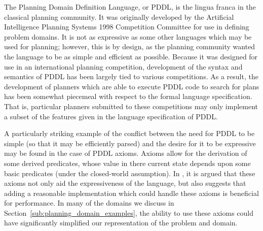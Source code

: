The Planning Domain Definition Language, or PDDL, is the lingua franca in the classical planning community. It was originally developed by the Artificial Intelligence Planning Systems 1998 Competition Committee for use in defining problem domains. It is not as expressive as some other languages which may be used for planning; however, this is by design, as the planning community wanted the language to be as simple and efficient as possible. Because it was designed for use in an international planning competition, development of the syntax and semantics of PDDL has been largely tied to various competitions. As a result, the development of planners which are able to execute PDDL code to search for plans has been somewhat piecemeal with respect to the formal language specification. That is, particular planners submitted to these competitions may only implement a subset of the features given in the language specification of PDDL. 

A particularly striking example of the conflict between the need for PDDL to be simple (so that it may be efficiently parsed) and the desire for it to be expressive may be found in the case of PDDL axioms. Axioms allow for the derivation of some derived predicates, whose value in there current state depends upon some basic predicates (under the closed-world assumption). In \cite{Thiebaux:2003ys}, it is argued that these axioms not only aid the expressiveness of the language, but also suggests that adding a reasonable implementation which could handle these axioms is beneficial for performance. In many of the domains we discuss in Section~\ref{sub:planning_domain_examples}, the ability to use these axioms could have significantly simplified our representation of the problem and domain.
 